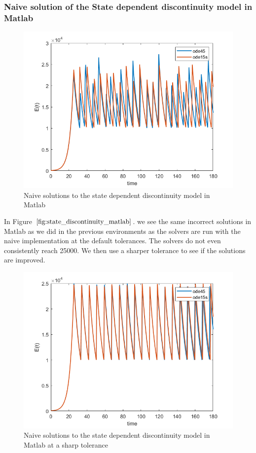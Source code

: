 \subsubsection{Naive solution of the State dependent discontinuity model in Matlab}
\begin{figure}[H]
\centering
\includegraphics[width=0.7\linewidth]{./figures/state_discontinuity_matlab}
\caption{Naive solutions to the state dependent discontinuity model in Matlab}
\label{fig:state_discontinuity_matlab}
\end{figure}
In Figure $\ref{fig:state_discontinuity_matlab}$. we see the same incorrect solutions in Matlab as we did in the previous environments as the solvers are run with the naive implementation at the default tolerances. The solvers do not even consistently reach 25000. We then use a sharper tolerance to see if the solutions are improved.

\begin{figure}[h]
\centering
\includegraphics[width=0.7\linewidth]{./figures/state_discontinuity_sharp_matlab}
\caption{Naive solutions to the state dependent discontinuity model in Matlab at a sharp tolerance}
\label{fig:state_discontinuity_sharp_matlab}
\end{figure}

